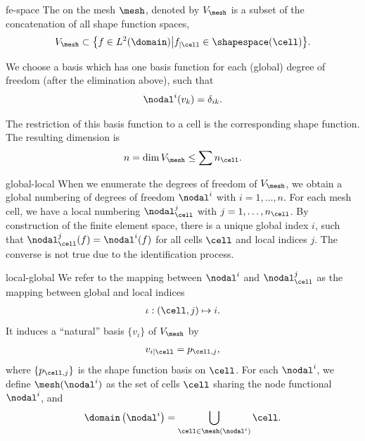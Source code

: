 \begin{Definition}{fe-space}
  The  on the mesh $\mesh$, denoted by
  $V_\mesh$ is a subset of the concatenation of all shape function
  spaces,
  \begin{gather}
    V_\mesh \subset \bigl\{ f\in L^2(\domain) \big|
    f_{|\cell} \in \shapespace(\cell) \bigr\}.
  \end{gather}
  
  We choose a basis which has one basis function for each (global)
  degree of freedom (after the elimination above), such that
  \begin{gather}
    \nodal^i(v_k) = \delta_{ik}.
  \end{gather}

  The restriction of this basis function to a cell is the
  corresponding shape function.  The resulting dimension is
  \begin{gather}
    n = \dim V_\mesh \le \sum n_\cell.
  \end{gather}
\end{Definition}

\begin{Notation}{global-local}
  When we enumerate the degrees of freedom of $V_\mesh$, we obtain a
  global numbering of degrees of freedom $\nodal^i$ with
  $i=1,\dots,n$. For each mesh cell, we have a local numbering
  $\nodal_\cell^j$ with $j=1,\dots,n_{\cell}$. By construction of the finite
  element space, there is a unique global index $i$, such that
  $\nodal_\cell^j(f) = \nodal^i(f)$ for all cells $\cell$ and local
  indices $j$. The converse is not true due to the identification
  process.
\end{Notation}

\begin{Definition}{local-global}
  We refer to the mapping between $\nodal^i$ and $\nodal_\cell^j$ as
  the mapping between global and local indices
  \begin{gather}
    \iota: (\cell, j) \mapsto i.
  \end{gather}
  It induces a
  ``natural'' basis $\{v_i\}$ of $V_\mesh$ by
  \begin{gather}
    v_{i|\cell} = p_{\cell,j},
  \end{gather}
  where $\{p_{\cell,j}\}$ is the shape function basis on $\cell$. For
  each $\nodal^i$, we define $\mesh(\nodal^i)$ as the set of cells
  $\cell$ sharing the node functional $\nodal^i$, and
  \begin{gather}
    \domain\left(\nodal^i\right) = \bigcup_{\cell\in \mesh(\nodal^i)} \cell.
  \end{gather}
\end{Definition}

